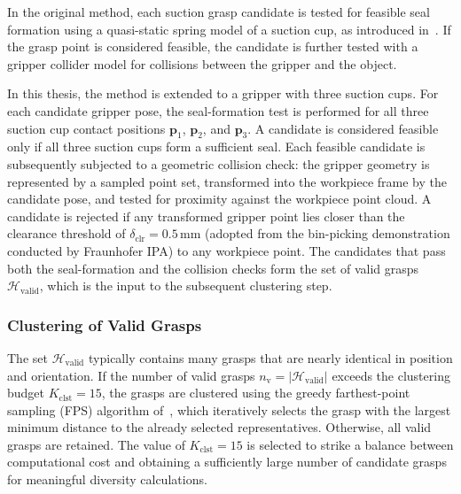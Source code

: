     In the original method, each suction grasp candidate is tested for feasible seal formation using
    a quasi-static spring model of a suction cup, as introduced in~\cite{SC_quasi_static}. If the
    grasp point is considered feasible, the candidate is further tested with a gripper collider
    model for collisions between the gripper and the object.

    In this thesis, the method is extended to a gripper with three suction cups. For each candidate gripper pose, the seal-formation test is
    performed for all three suction cup contact positions $\mathbf{p}_1$, $\mathbf{p}_2$, and $\mathbf{p}_3$. A candidate is considered feasible only
    if all three suction cups form a sufficient seal. Each feasible candidate is subsequently subjected to a geometric collision check: the gripper
    geometry is represented by a sampled point set, transformed into the workpiece frame by the candidate pose, and tested for proximity against the
    workpiece point cloud. A candidate is rejected if any transformed gripper point lies closer than the clearance threshold of $\delta_{\mathrm{clr}} =
    0.5\,\text{mm}$ (adopted from the bin-picking demonstration conducted by Fraunhofer IPA) to any workpiece point. The candidates that pass both the
    seal-formation and the collision checks form the set of valid grasps $\mathcal{H}_{\mathrm{valid}}$, which is the input to the subsequent
    clustering step.

\subsubsection{Clustering of Valid Grasps}

    The set $\mathcal{H}_{\mathrm{valid}}$ typically contains many grasps that are nearly identical
    in position and orientation. If the number of valid grasps
    $n_{\mathrm{v}} = |\mathcal{H}_{\mathrm{valid}}|$ exceeds the clustering budget
    $K_{\mathrm{clst}} = 15$, the grasps are clustered using the greedy farthest-point sampling
    (FPS) algorithm of~\cite{gonzalez1985clustering}, which iteratively selects the grasp with the
    largest minimum distance to the already selected representatives. Otherwise, all valid grasps are
    retained. The value of $K_{\mathrm{clst}} = 15$ is selected to strike a balance between computational cost and obtaining a sufficiently large
    number of candidate grasps for meaningful diversity calculations.

